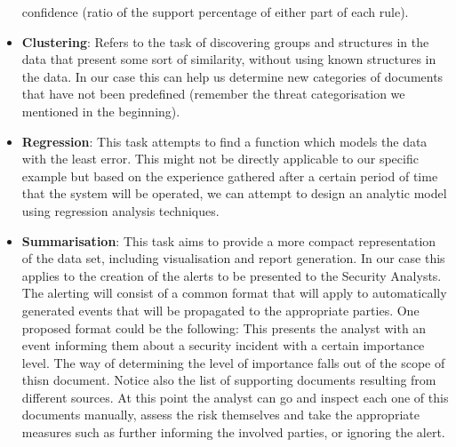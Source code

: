 \documentclass[12pt]{article}
\newcounter{subsubsubsection}[subsubsection]
\begin{document}
\begin{itemize}
confidence (ratio of the support percentage of either part of each rule).
\item 
\textbf{Clustering}: Refers to the task of discovering groups and structures in the data that present
some sort of similarity, without using known structures in the data. In our case this can help us
determine new categories of documents that have not been predefined (remember the threat
categorisation we mentioned in the beginning).
\item
\textbf{Regression}: This task attempts to find a function which models the data with the least error.
This might not be directly applicable to our specific example but based on the experience
gathered after a certain period of time that the system will be operated, we can attempt to
design an analytic model using regression analysis techniques.
\item
\textbf{Summarisation}: This task aims to provide a more compact representation of the data set, including visualisation and report generation. In our case this applies to the creation of the alerts to be presented to the Security Analysts. The alerting will consist of a common format that will apply to automatically generated events that will be propagated to the appropriate parties. One proposed format could be the following:
This presents the analyst with an event informing them about a security incident with a certain importance level. The way of determining the level of importance falls out of the scope of thisn document. Notice also the list of supporting documents resulting from different sources. At this point the analyst can go and inspect each one of this documents manually, assess the risk themselves and take the appropriate measures such as further informing the involved parties, or ignoring the alert.
\end{itemize}
\end{document}
